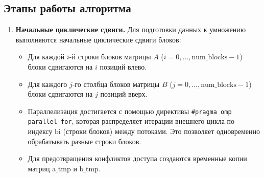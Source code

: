 \documentclass[a4paper,12pt]{article}
\begin{document}
\subsection{Этапы работы алгоритма}

\begin{enumerate}
    \item \textbf{Начальные циклические сдвиги.}
    Для подготовки данных к умножению выполняются начальные циклические сдвиги блоков:
    \begin{itemize}
        \item Для каждой \( i \)-й строки блоков матрицы \( A \) (\( i = 0, \dots, \text{num\_blocks} - 1 \)) блоки сдвигаются на \( i \) позиций влево.
        \item Для каждого \( j \)-го столбца блоков матрицы \( B \) (\( j = 0, \dots, \text{num\_blocks} - 1 \)) блоки сдвигаются на \( j \) позиций вверх.
        \item Параллелизация достигается с помощью директивы \texttt{\#pragma omp parallel for}, которая распределяет итерации внешнего цикла по индексу \( \text{bi} \) (строки блоков) между потоками. Это позволяет одновременно обрабатывать разные строки блоков.
        \item Для предотвращения конфликтов доступа создаются временные копии матриц \( \text{a\_tmp} \) и \( \text{b\_tmp} \).
    \end{itemize}


\end{enumerate}
\end{document}
